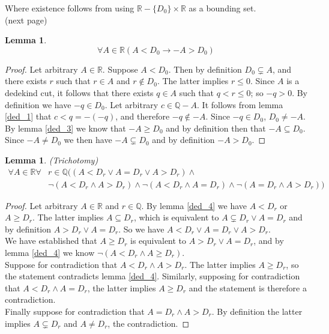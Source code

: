 \documentclass{report}
\newtheorem{lemma}[theo]{Lemma}
\begin{document}
\noindent Where existence follows from using $\mathbb R-\{D_0\}\times\mathbb R$ as a bounding set.\\
(next page)\newpage
\begin{lemma}\label{ded_5}
\begin{equation*}
\forall A\in\mathbb R(A<D_0\to-A>D_0)
\end{equation*}
\end{lemma}
\begin{proof}
Let arbitrary $A\in\mathbb R$. Suppose $A<D_0$. Then by definition $D_0\subsetneq A$, and there exists $r$ such that $r\in A$ and $r\notin D_0$. 
The latter implies $r\leq0$. Since $A$ is a dedekind cut, it follows that 
there exists $q\in A$ such that $q<r\leq0$; so $-q>0$. By definition we have $-q\in D_0$.
Let arbitrary $c\in\mathbb Q-A$. It follows 
from lemma \ref{ded_1} that $c<q=-(-q)$, and therefore $-q\notin-A$. Since $-q\in D_0$, $D_0\neq-A$.\\
\indent By lemma \ref{ded_3} we know that $-A\geq D_0$ and by definition then that $-A\subseteq D_0$. Since $-A\neq D_0$ we then have 
$-A\subsetneq D_0$ and by definition $-A>D_0$.
\end{proof}
\begin{lemma}\label{R_trichotomy}(Trichotomy)
\begin{align*}
\forall A\in\mathbb R\forall&r\in\mathbb Q((A<D_r\lor A=D_r\lor A>D_r)\land\\
&\neg(A<D_r\land A>D_r)\land\neg(A<D_r\land A=D_r)\land\neg(A=D_r\land A>D_r))
\end{align*}
\end{lemma}
\begin{proof}
Let arbitrary $A\in\mathbb R$ and $r\in\mathbb Q$. By lemma \ref{ded_4} we have $A<D_r$ or $A\geq D_r$. The latter implies $A\subseteq D_r$, 
which is equivalent to $A\subsetneq D_r\lor A=D_r$ and by definition
$A>D_r\lor A=D_r$. So we have $A<D_r\lor A=D_r\lor A>D_r$.\\
\indent We have established that $A\geq D_r$ is equivalent to $A>D_r\lor A=D_r$, and by lemma \ref{ded_4} we know $\neg(A<D_r\land A\geq D_r)$.\\
\indent Suppose for contradiction that $A<D_r\land A>D_r$. The latter implies $A\geq D_r$, so the statement contradicts lemma \ref{ded_4}.
Similarly, supposing for contradiction that $A<D_r\land A=D_r$, the latter implies $A\geq D_r$ and the statement is therefore 
a contradiction.\\
\indent Finally suppose for contradiction that $A=D_r\land A>D_r$. By definition the latter implies $A\subsetneq D_r$ and $A\neq D_r$, the contradiction.
\end{proof}
\end{document}
